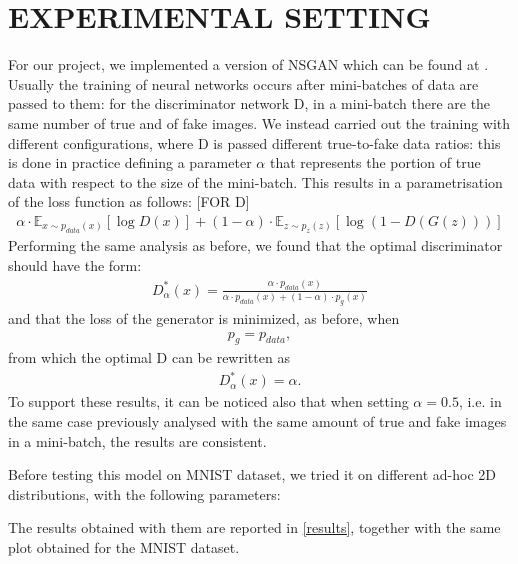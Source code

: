 \section{EXPERIMENTAL SETTING} \label{expsetting}

For our project, we implemented a version of NSGAN which can be found at \cite{bibid}. Usually the training of neural networks occurs after mini-batches of data are passed to them: for the discriminator network D, in a mini-batch there are the same number of true and of fake images. We instead carried out the training with different configurations, where D is passed different true-to-fake data ratios: this is done in practice defining a parameter $\alpha$ that represents the portion of true data with respect to the size of the mini-batch. This results in a parametrisation of the loss function as follows: [FOR D]
\begin{align*}
	\alpha\cdot\mathbb{E}_{x \sim p_{data}(x)}[\log D(x)] + (1-\alpha)\cdot\mathbb{E}_{z \sim p_{z}(z)}[\log (1-D(G(z)))]
\end{align*}
Performing the same analysis as before, we found that the optimal discriminator should have the form:
\begin{align*}
D_{\alpha}^*(x) = \frac{\alpha \cdot p_{data}(x)}{\alpha \cdot p_{data}(x) + (1-\alpha)\cdot p_g(x)}
\end{align*}
and that the loss of the generator is minimized, as before, when
\begin{align*}
p_g = p_{data},
\end{align*}
from which the optimal D can be rewritten as
\begin{align*}
D_{\alpha}^*(x) = \alpha.
\end{align*}
To support these results, it can be noticed also that when setting $\alpha = 0.5$, i.e. in the same case previously analysed with the same amount of true and fake images in a mini-batch, the results are consistent.

Before testing this model on MNIST dataset, we tried it on different ad-hoc 2D distributions, with the following parameters:


The results obtained with them are reported in \ref{results}, together with the same plot obtained for the MNIST dataset.